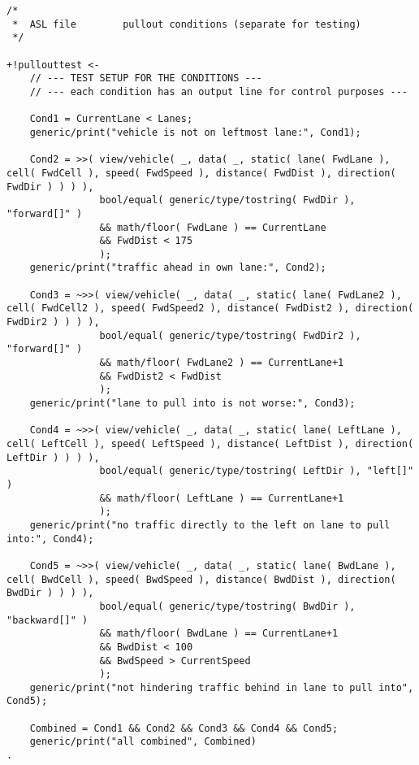 \newpage


\begin{lstlisting}[style=asl, 
                   keywords={}, 
                   keywords={[2]}, 
                   keywords={[3]}, 
                   caption={Agentenscript: Auszug Bedingungen pullout-Plan},
                   label={lst:pullout-cond}]      
/*
 *  ASL file        pullout conditions (separate for testing)
 */

+!pullouttest <-
    // --- TEST SETUP FOR THE CONDITIONS ---
    // --- each condition has an output line for control purposes ---

    Cond1 = CurrentLane < Lanes; 
    generic/print("vehicle is not on leftmost lane:", Cond1); 

    Cond2 = >>( view/vehicle( _, data( _, static( lane( FwdLane ), cell( FwdCell ), speed( FwdSpeed ), distance( FwdDist ), direction( FwdDir ) ) ) ),
                bool/equal( generic/type/tostring( FwdDir ), "forward[]" ) 
                && math/floor( FwdLane ) == CurrentLane
                && FwdDist < 175 
                ); 
    generic/print("traffic ahead in own lane:", Cond2); 

    Cond3 = ~>>( view/vehicle( _, data( _, static( lane( FwdLane2 ), cell( FwdCell2 ), speed( FwdSpeed2 ), distance( FwdDist2 ), direction( FwdDir2 ) ) ) ),
                bool/equal( generic/type/tostring( FwdDir2 ), "forward[]" ) 
                && math/floor( FwdLane2 ) == CurrentLane+1
                && FwdDist2 < FwdDist 
                ); 
    generic/print("lane to pull into is not worse:", Cond3); 

    Cond4 = ~>>( view/vehicle( _, data( _, static( lane( LeftLane ), cell( LeftCell ), speed( LeftSpeed ), distance( LeftDist ), direction( LeftDir ) ) ) ),
                bool/equal( generic/type/tostring( LeftDir ), "left[]" ) 
                && math/floor( LeftLane ) == CurrentLane+1
                );
    generic/print("no traffic directly to the left on lane to pull into:", Cond4);

    Cond5 = ~>>( view/vehicle( _, data( _, static( lane( BwdLane ), cell( BwdCell ), speed( BwdSpeed ), distance( BwdDist ), direction( BwdDir ) ) ) ),
                bool/equal( generic/type/tostring( BwdDir ), "backward[]" ) 
                && math/floor( BwdLane ) == CurrentLane+1
                && BwdDist < 100
                && BwdSpeed > CurrentSpeed 
                );
    generic/print("not hindering traffic behind in lane to pull into", Cond5);

    Combined = Cond1 && Cond2 && Cond3 && Cond4 && Cond5;
    generic/print("all combined", Combined)
.\end{lstlisting}

